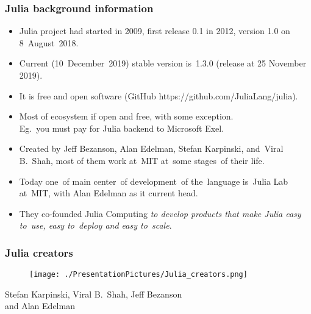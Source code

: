 \documentclass[10pt,t]{beamer}
\begin{document}
\begin{frame}
  \frametitle{Julia background information}


  \begin{itemize}

  \item Julia project had started in 2009, first release 0.1 in 2012,
    version 1.0 on 8~August~2018.

  \item Current (10~December~2019) stable version is~1.3.0 (release at 25
    November 2019).

  \item It is \alert{free} and \alert{open software} (GitHub
    {https://github.com/JuliaLang/julia}).

  \item Most of ecosystem if open and free, with \alert{some}
    exception. \\
    Eg.~you must pay for Julia backend to Microsoft Exel.

  \item Created by Jeff Bezanson, Alan Edelman, Stefan Karpinski,
    and~Viral B.~Shah, most of them work at~MIT at~some stages~of
    their life.

  \item Today one~of main center~of development~of the~language
    is~Julia Lab at~MIT, with Alan Edelman as it current head.

  \item They co-founded Julia Computing \textit{to develop products that
      make Julia easy to~use, easy to~deploy and easy to~scale}.

  \end{itemize}

\end{frame}





\begin{frame}
  \frametitle{Julia creators}


  \begin{figure}

    \centering

    \texttt{[image: ./PresentationPictures/Julia\_creators.png]}

  \end{figure}


  \begin{center}

    Stefan Karpinski, Viral B.~Shah, Jeff Bezanson \\
    \hspace{-12em} and Alan Edelman

  \end{center}

\end{frame}
\end{document}
